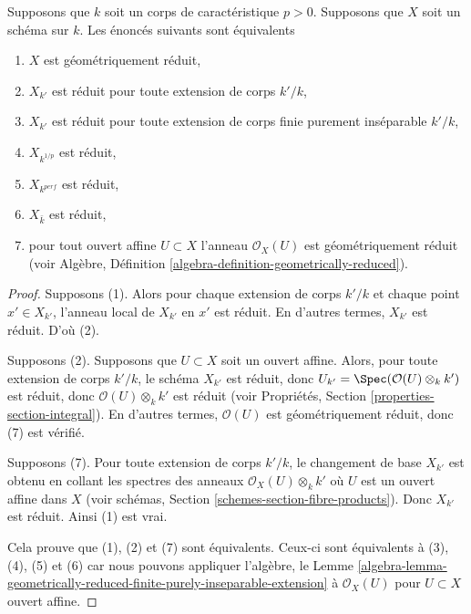 \begin{lemma}
\label{lemma-geometrically-reduced}
Supposons que $k$ soit un corps de caractéristique $p > 0$. Supposons
que $X$ soit un schéma sur $k$. Les énoncés suivants sont équivalents
\begin{enumerate}
\item $X$ est géométriquement réduit, \item
$X_{k'}$ est réduit pour toute extension de
corps $k'/k$, \item $X_{k'}$ est réduit pour
toute extension de corps finie purement
inséparable $k'/k$, \item $X_{k^{1/p}}$ est
réduit, \item $X_{k^{perf}}$ est réduit, \item
$X_{\bar k}$ est réduit, \item pour tout ouvert
affine $U \subset X$ l'anneau $\mathcal{O}_X(U)$
est géométriquement réduit (voir Algèbre,
Définition \ref{algebra-definition-geometrically-reduced}).
\end{enumerate}
\end{lemma}

\begin{proof}
Supposons (1). Alors pour chaque extension de corps $k'/k$ et
chaque point $x' \in X_{k'}$, l'anneau local de $X_{k'}$ en $x'$
est réduit. En d'autres termes, $X_{k'}$ est réduit. D'où (2).

\medskip\noindent
Supposons (2). Supposons que $U \subset X$ soit un ouvert affine.
Alors, pour toute extension de corps $k'/k$, le schéma $X_{k'}$
est réduit, donc $U_{k'} = \Spec(\mathcal{O}(U)\otimes_k k')$ est
réduit, donc $\mathcal{O}(U)\otimes_k k'$ est réduit (voir
Propriétés, Section \ref{properties-section-integral}). En d'autres
termes, $\mathcal{O}(U)$ est géométriquement réduit, donc (7) est vérifié.

\medskip\noindent
Supposons (7). Pour toute extension de corps $k'/k$, le
changement de base $X_{k'}$ est obtenu en collant les spectres
des anneaux $\mathcal{O}_X(U) \otimes_k k'$ où $U$ est un
ouvert affine dans $X$ (voir schémas, Section
\ref{schemes-section-fibre-products}). Donc $X_{k'}$ est réduit. Ainsi (1) est vrai.

\medskip\noindent
Cela prouve que (1), (2) et (7) sont équivalents. Ceux-ci sont
équivalents à (3), (4), (5) et (6) car nous pouvons appliquer
l'algèbre, le Lemme
\ref{algebra-lemma-geometrically-reduced-finite-purely-inseparable-extension} à $\mathcal{O}_X(U)$ pour $U \subset X$ ouvert affine.
\end{proof}

